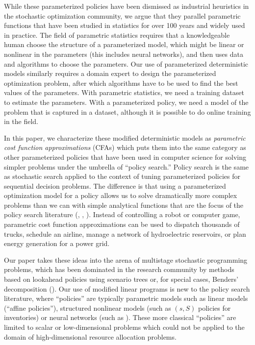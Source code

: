 \documentclass[11pt,oneside,fleqn,reqno,titlepage]{article}
\begin{document}
While these parameterized policies have been dismissed as industrial heuristics in the stochastic optimization community, we argue that they parallel parametric functions that have been studied in statistics for over 100 years and widely used in practice.  The field of parametric statistics requires that a knowledgeable human choose the structure of a parameterized model, which might be linear or nonlinear in the parameters (this includes neural networks), and then uses data and algorithms to choose the parameters.  Our use of parameterized deterministic models similarly requires a domain expert to design the parameterized optimization problem, after which algorithms have to be used to find the best values of the parameters.  With parametric statistics, we need a training dataset to estimate the parameters.  With a parameterized policy, we need a model of the problem that is captured in a dataset, although it is possible to do online training in the field.

In this paper, we characterize these modified deterministic models as {\it parametric cost function approximations} (CFAs) which puts them into the same category as other parameterized policies that have been used in computer science for solving simpler problems under the umbrella of ``policy search.'' Policy search is the same as stochastic search applied to the context of tuning parameterized policies for sequential decision problems.  The difference is that using a parameterized optimization model for a policy allows us to solve dramatically more complex problems than we can with simple analytical functions that are the focus of the policy search literature (\cite{Sutton2018}, \cite{Robots}, \cite{Levine2013}).  Instead of controlling a robot or computer game, parametric cost function approximations can be used to dispatch thousands of trucks, schedule an airline, manage a network of hydroelectric reservoirs, or plan energy generation for a power grid.

Our paper takes these ideas into the arena of multistage stochastic programming problems, which has been dominated in the research community by methods based on lookahead policies using scenario trees or, for special cases, Benders' decomposition (\cite{birge2011introduction,sen2014multistage,bayraksan2009assessing,zhao2013multi}).  Our use of modified linear programs is new to the policy search literature, where ``policies'' are typically parametric models such as linear models (``affine policies''), structured nonlinear models (such as $(s,S)$ policies for inventories) or neural networks (such as \cite{HanE16}). These more classical ``policies'' are limited to scalar or low-dimensional problems which could not be applied to the domain of high-dimensional resource allocation problems.
\end{document}
